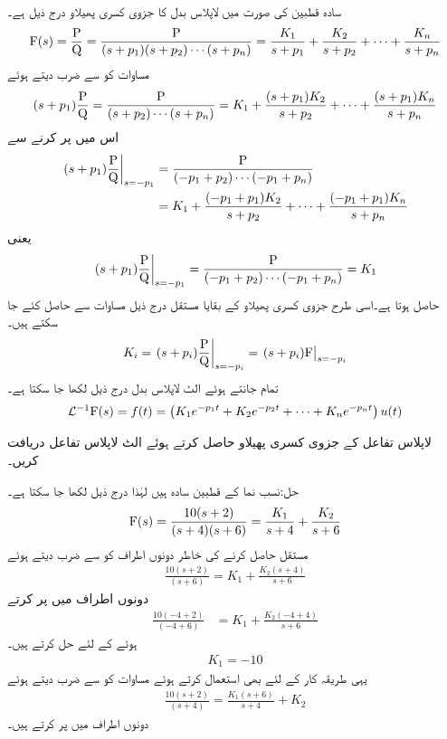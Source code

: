 سادہ قطبین کی صورت میں لاپلاس بدل  کا جزوی کسری پھیلاو درج ذیل ہے۔
\begin{align*}
{\ensuremath{{\textup{F}}}}(s)=\frac{{{\textup{P}}}}{{{\textup{Q}}}}=\frac{{{\textup{P}}}}{(s+p_1)(s+p_2)\cdots(s+p_n)}=\frac{K_1}{s+p_1}+\frac{K_2}{s+p_2}+\cdots +\frac{K_n}{s+p_n}
\end{align*}
مساوات کو  سے ضرب دیتے ہوئے
\begin{align*}
(s+p_1)\frac{{{\textup{P}}}}{{{\textup{Q}}}}=\frac{{{\textup{P}}}}{(s+p_2)\cdots(s+p_n)}=K_1+\frac{(s+p_1)K_2}{s+p_2}+\cdots +\frac{(s+p_1)K_n}{s+p_n}
\end{align*}
اس میں  پر کرنے سے
\begin{align*}
\left. (s+p_1)\frac{{{\textup{P}}}}{{{\textup{Q}}}}\right|_{s=-p_1}&=\frac{{{\textup{P}}}}{(-p_1+p_2)\cdots(-p_1+p_n)}\\
&=K_1+\frac{(-p_1+p_1)K_2}{s+p_2}+\cdots +\frac{(-p_1+p_1)K_n}{s+p_n}
\end{align*}
یعنی
\begin{align*}
\left. (s+p_1)\frac{{{\textup{P}}}}{{{\textup{Q}}}}\right|_{s=-p_1}=\frac{{{\textup{P}}}}{(-p_1+p_2)\cdots(-p_1+p_n)}=K_1
\end{align*}
حاصل ہوتا ہے۔اسی طرح جزوی کسری پھیلاو کے بقایا مستقل درج ذیل مساوات سے حاصل کئے جا سکتے ہیں۔
\begin{align}
K_i=\left. (s+p_i)\frac{{{\textup{P}}}}{{{\textup{Q}}}}\right|_{s=-p_i}=\left. (s+p_i) {{\textup{F}}} \right|_{s=-p_i}
\end{align}
تمام  جانتے ہوئے الٹ لاپلاس بدل درج ذیل لکھا جا سکتا ہے۔
\begin{align}
\mathcal{L}^{-1} {{\textup{F}}}(s)=f(t)=\left(K_1 e^{-p_1 t}+K_2 e^{-p_2 t}+\cdots+K_n e^{-p_n t}\right) u(t)
\end{align}

لاپلاس تفاعل  کے جزوی کسری پھیلاو حاصل کرتے ہوئے الٹ لاپلاس تفاعل  دریافت کریں۔ 

حل:نسب نما کے قطبین سادہ ہیں لہٰذا درج ذیل لکھا جا سکتا ہے۔
\begin{align}\label{مساوات_لاپلاس_سادہ_قطبین_الف}
{\ensuremath{{\textup{F}}}}(s)=\frac{10(s+2)}{(s+4)(s+6)}=\frac{K_1}{s+4}+\frac{K_2}{s+6}
\end{align}
مستقل  حاصل کرنے کی خاطر دونوں اطراف کو  سے ضرب دیتے ہوئے
\begin{align*}
\frac{10(s+2)}{(s+6)}=K_1+\frac{K_2(s+4)}{s+6}
\end{align*}
دونوں اطراف میں  پر کرتے  
\begin{align*}
\frac{10(-4+2)}{(-4+6)}&=K_1+\frac{K_2(-4+4)}{s+6}
\end{align*}
ہوئے  کے لئے حل کرتے ہیں۔
\begin{align*}
K_1=-10
\end{align*}
یہی طریقہ کار  کے لئے بھی استعمال کرتے ہوئے مساوات  کو  سے ضرب دیتے ہوئے
\begin{align*}
\frac{10(s+2)}{(s+4)}=\frac{K_1(s+6)}{s+4}+K_2
\end{align*}
دونوں اطراف میں  پر کرتے ہیں۔

